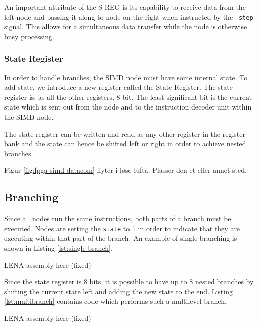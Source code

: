 An important attribute of the S REG is its capability to receive data from the
left node and passing it along to node on the right when instructed by the {\tt
  step} signal. This allows for a simultaneous data transfer while the node is
otherwise busy processing.

\subsubsection{State Register}
In order to handle branches, the \ac{SIMD} node must have some internal
state. To add state, we introduce a new register called the State Register. The
state register is, as all the other registers, 8-bit. The least significant bit
is the current state which is sent out from the node and to the instruction
decoder unit within the \ac{SIMD} node.

The state register can be written and read as any other register in the register
bank and the state can hence be shifted left or right in order to achieve nested
branches.


{\sc \color{red} Figur \ref{fig:fpga-simd-datacom} flyter i løse lufta. Plasser
  den et eller annet sted.}

\subsection{Branching}
Since all nodes run the same instructions, both parts of a branch must be
executed. Nodes are setting the {\tt state} to 1 in order to indicate that they
are executing within that part of the branch. An example of single branching is
shown in Listing \ref{lst:single-branch}.

{\sc \color{green} LENA-assembly here (fixed)}

Since the state register is 8 bits, it is possible to have up to 8 nested
branches by shifting the current state left and adding the new state to the
end. Listing \ref{lst:multibranch} contains code which performs such a
multilevel branch.

{\sc \color{green} LENA-assembly here (fixed)}
